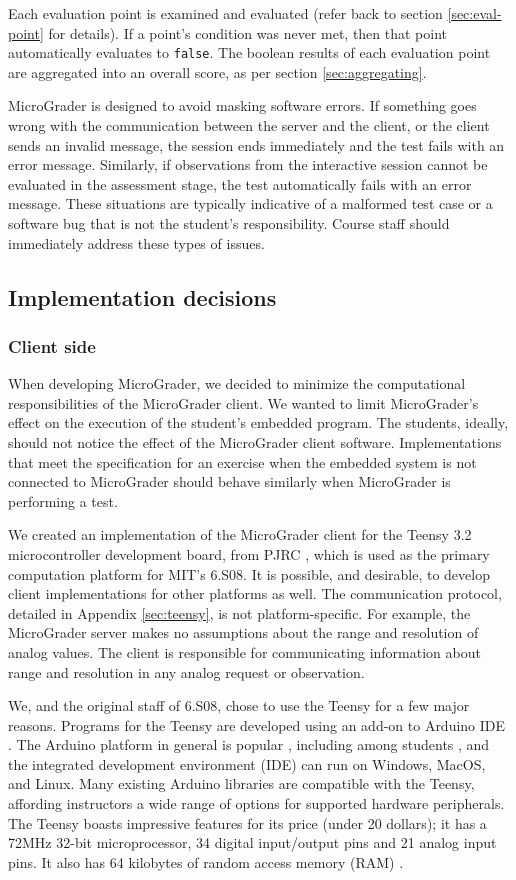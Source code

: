 \documentclass[12pt]{article}
\begin{document}
Each evaluation point is examined and evaluated (refer back to section \ref{sec:eval-point} for details).  If a point's condition was never met, then that point automatically evaluates to \texttt{false}.  The boolean results of each evaluation point are aggregated into an overall score, as per section \ref{sec:aggregating}.

MicroGrader is designed to avoid masking software errors.  If something goes wrong with the communication between the server and the client, or the client sends an invalid message, the session ends immediately and the test fails with an error message.  Similarly, if observations from the interactive session cannot be evaluated in the assessment stage, the test automatically fails with an error message.  These situations are typically indicative of a malformed test case or a software bug that is not the student's responsibility.  Course staff should immediately address these types of issues.


\subsection{Implementation decisions}
\subsubsection{Client side}
When developing MicroGrader, we decided to minimize the computational responsibilities of the MicroGrader client.  We wanted to limit MicroGrader's effect on the execution of the student's embedded program.  The students, ideally, should not notice the effect of the MicroGrader client software.  Implementations that meet the specification for an exercise when the embedded system is not connected to MicroGrader should behave similarly when MicroGrader is performing a test.

We created an implementation of the MicroGrader client for the Teensy 3.2 microcontroller development board, from PJRC \cite{teensy}, which is used as the primary computation platform for MIT's 6.S08.  It is possible, and desirable, to develop client implementations for other platforms as well.  The communication protocol, detailed in Appendix \ref{sec:teensy}, is not platform-specific.  For example, the MicroGrader server makes no assumptions about the range and resolution of analog values.  The client is responsible for communicating information about range and resolution in any analog request or observation.

We, and the original staff of 6.S08, chose to use the Teensy for a few major reasons.  Programs for the Teensy are developed using an add-on to Arduino IDE \cite{arduino-ide}.  The Arduino platform in general is popular \cite{arduino-popular}, including among students \cite{arduino-students}, and the integrated development environment (IDE) can run on Windows, MacOS, and Linux.  Many existing Arduino libraries are compatible with the Teensy, affording instructors a wide range of options for supported hardware peripherals.  The Teensy boasts impressive features for its price (under 20 dollars); it has a 72MHz 32-bit microprocessor, 34 digital input/output pins and 21 analog input pins.  It also has 64 kilobytes of random access memory (RAM) \cite{teensy-specs}.
\end{document}

